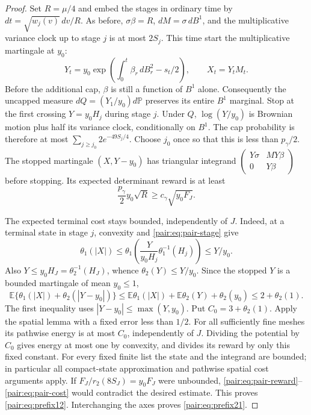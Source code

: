 \documentclass[11pt]{article}
\newcommand{\E}{\mathbb E}
\newcommand{\PP}{\mathbb P}
\numberwithin{equation}{section}
\begin{document}
\begin{proof}
Set \(R=\mu/4\) and embed the stages in ordinary time by
\(dt=\sqrt{w_j(v)}\,dv/R\).  As before,
\(\sigma\beta=R\), \(dM=\sigma\,dB^1\), and the multiplicative
variance clock up to stage \(j\) is at most \(2S_j\).  This time start
the multiplicative martingale at \(y_0\):
\[
 Y_t=y_0\exp\left(\int_0^t\beta_r\,dB_r^2-s_t/2\right),
 \qquad X_t=Y_tM_t.
\]
Before the additional cap, \(\beta\) is still a function of \(B^1\)
alone.  Consequently the uncapped measure
\(dQ=(Y_1/y_0)d\PP\) preserves its entire \(B^1\) marginal.
Stop at the first crossing \(Y=y_0H_j\) during stage \(j\).
Under \(Q\), \(\log(Y/y_0)\) is Brownian motion plus half its
variance clock, conditionally on \(B^1\).  The cap probability is
therefore at most \(\sum_{j\ge j_0}2e^{-49S_j/4}\).
Choose \(j_0\) once so that this is less than \(p_\gamma/2\).
The stopped martingale \((X,Y-y_0)\) has triangular integrand
\(\left(\begin{smallmatrix}Y\sigma&MY\beta\\0&Y\beta\end{smallmatrix}\right)\)
before stopping.  Its expected determinant reward is at least
\[
 \frac{p_\gamma}{2}y_0\sqrt R
       \ge c_\gamma\sqrt{y_0F_J}.
 \tag{P7}\label{pair:eq:pair-reward}
\]

The expected terminal cost stays bounded, independently of \(J\).
Indeed, at a terminal state in stage \(j\), convexity and
\eqref{pair:eq:pair-stage} give
\[
 \theta_1(|X|)\le
 \theta_1\left(\frac{Y}{y_0H_j}\theta_1^{-1}(H_j)\right)
 \le Y/y_0.
\]
Also \(Y\le y_0H_J=\theta_2^{-1}(H_J)\), whence
\(\theta_2(Y)\le Y/y_0\).  Since the stopped \(Y\) is a bounded
martingale of mean \(y_0\le1\),
\[
 \E\{\theta_1(|X|)+\theta_2(|Y-y_0|)\}
 \le\E\theta_1(|X|)+\E\theta_2(Y)+\theta_2(y_0)
 \le2+\theta_2(1).
 \tag{P8}\label{pair:eq:pair-cost}
\]
The first inequality uses
\(|Y-y_0|\le\max(Y,y_0)\). Put \(C_0=3+\theta_2(1)\).
Apply the spatial lemma with a fixed error less than \(1/2\).
For all sufficiently fine meshes its pathwise energy is at most
\(C_0\), independently of \(J\). Dividing the potential by
\(C_0\) gives energy at most one by convexity, and divides its
reward by only this fixed constant. For every fixed finite list the state
and the integrand are bounded; in particular all compact-state
approximation and pathwise spatial cost arguments apply.  If
\(F_J/r_2(8S_J)=y_0F_J\) were unbounded,
\eqref{pair:eq:pair-reward}--\eqref{pair:eq:pair-cost} would contradict
the desired estimate.  This proves \eqref{pair:eq:prefix12}.
Interchanging the axes proves \eqref{pair:eq:prefix21}.
\end{proof}
\end{document}
